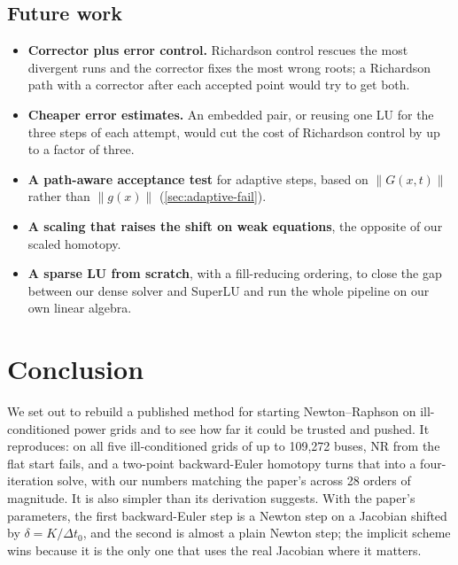 \documentclass[11pt,a4paper]{article}
\newcommand{\norm}[1]{\lVert #1\rVert}
\begin{document}
\subsection{Future work}\label{sec:future}
\begin{itemize}
  \item \textbf{Corrector plus error control.} Richardson control rescues the most divergent runs and the
        corrector fixes the most wrong roots; a Richardson path with a corrector after each accepted point
        would try to get both.
  \item \textbf{Cheaper error estimates.} An embedded pair, or reusing one LU for the three steps of each
        attempt, would cut the cost of Richardson control by up to a factor of three.
  \item \textbf{A path-aware acceptance test} for adaptive steps, based on $\norm{G(x,t)}$ rather than
        $\norm{g(x)}$ (\cref{sec:adaptive-fail}).
  \item \textbf{A scaling that raises the shift on weak equations}, the opposite of our scaled homotopy.
  \item \textbf{A sparse LU from scratch}, with a fill-reducing ordering, to close the gap between our dense
        solver and SuperLU and run the whole pipeline on our own linear algebra.
\end{itemize}

\section{Conclusion}\label{sec:conclusion}
We set out to rebuild a published method for starting Newton--Raphson on ill-conditioned power grids and to
see how far it could be trusted and pushed. It reproduces: on all five ill-conditioned grids of up to
109{,}272 buses, NR from the flat start fails, and a two-point backward-Euler homotopy turns that into a
four-iteration solve, with our numbers matching the paper's across 28 orders of magnitude. It is also
simpler than its derivation suggests. With the paper's parameters, the first backward-Euler step is a
Newton step on a Jacobian shifted by $\delta=K/\Delta t_0$, and the second is almost a plain Newton step;
the implicit scheme wins because it is the only one that uses the real Jacobian where it matters.
\end{document}
